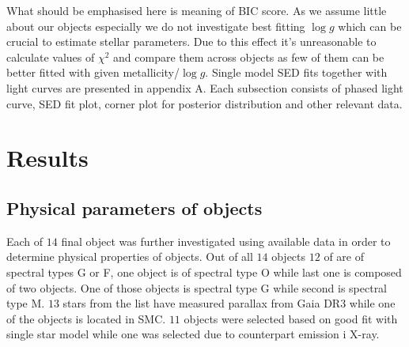 \documentclass{pracalicmgr}
\begin{document}
What should be emphasised here is meaning of BIC score. As we assume little about our objects especially we do not investigate best fitting 
$\log{g}$ which can be crucial to estimate stellar parameters. Due to this effect it's unreasonable to calculate values of $\chi^2$ and compare them 
across objects as few of them can be better fitted with given metallicity/$\log{g}$.
Single model SED fits together with light curves are presented in appendix A. Each subsection consists of phased light curve, 
SED fit plot, corner plot for posterior distribution and other relevant data.
\chapter{Results}
\section{Physical parameters of objects}
Each of $14$ final object was further investigated using available data in order to determine physical properties of objects.
Out of all $14$ objects $12$ of are of spectral types G or F, one object is of spectral type O while last one is composed of two objects. One of those objects is spectral type G while 
second is spectral type M. $13$ stars from the list have measured parallax from Gaia DR3 while one of the objects is located in SMC.
$11$ objects were selected based on good fit with single star model while one was selected due to counterpart emission i X-ray.
\end{document}
